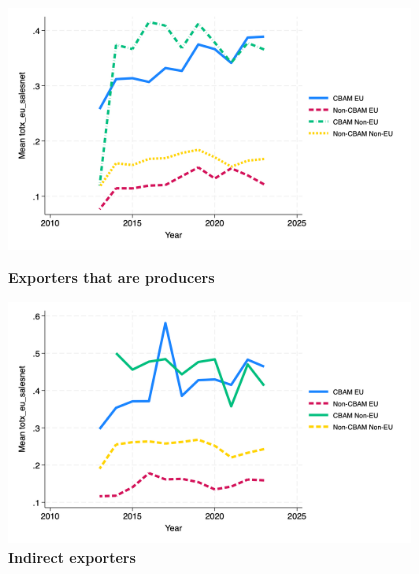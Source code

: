 \documentclass{article}
\begin{document}
\begin{figure}[H]
\centering
\includegraphics[width=0.95\textwidth]{totx_eu_salesnet_ep.png}
\caption{\textbf{Exporters that are producers}}
\includegraphics[width=0.95\textwidth]{totx_eu_salesnet_indir.png}
\caption{\textbf{Indirect exporters}}
\end{figure}
\end{document}
